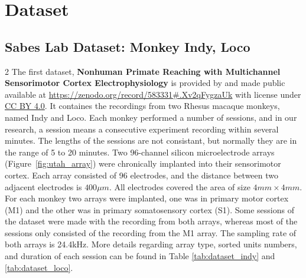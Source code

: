 \section{Dataset}
\label{sec:dataset}
\subsection{Sabes Lab Dataset: Monkey Indy, Loco}

\begin{multicols}{2}
The first dataset, \textbf{Nonhuman Primate Reaching with Multichannel Sensorimotor Cortex Electrophysiology} is provided by \cite{makin2018} and made public available at \url{https://zenodo.org/record/583331#.Xv2qFygzaUk} with license under \href{https://creativecommons.org/licenses/by/4.0/legalcode}{CC BY 4.0}.
It containes the recordings from two Rhesus macaque monkeys, named Indy and Loco.
Each monkey performed a number of sessions, and in our research, a session means a consecutive experiment recording within several minutes.
The lengths of the sessions are not consistant, but normally they are in the range of 5 to 20 minutes.
Two 96-channel silicon microelectrode arrays (Figure~\ref{fig:utah_array}) were chronically implanted into their sensorimotor cortex.
Each array consisted of 96 electrodes, and the distance between two adjacent electrodes is $400 \mu m$. All electrodes covered the area of size $4mm \times 4mm$.
For each monkey two arrays were implanted, one was in primary motor cortex (M1) and the other was in primary somatosensory cortex (S1).
Some sessions of the dataset were made with the recording from both arrays, whereas most of the sessions only consisted of the recording from the M1 array.
The sampling rate of both arrays is 24.4kHz. More details regarding array type, sorted units numbers, and duration of each session can be found in Table \ref{tab:dataset_indy} and \ref{tab:dataset_loco}.
\end{multicols}

